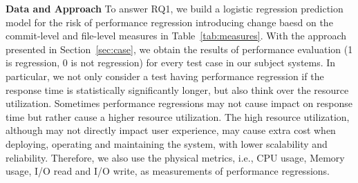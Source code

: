 

 \textbf{Data and Approach}
To answer RQ1, we build a logistic regression prediction model for the risk of performance regression introducing change baesd on the commit-level and file-level measures in Table~\ref{tab:measures}. With the approach presented in Section~\ref{sec:case}, we obtain the results of performance evaluation (1 is regression, 0 is not regression) for every test case in our subject systems. In particular, we not only consider a test having performance regression if the response time is statistically significantly longer, but also think over the resource utilization. Sometimes performance regressions may not cause impact on response time but rather cause a higher resource utilization. The high resource utilization, although may not directly impact user experience, may cause extra cost when deploying, operating and maintaining the system, with lower scalability and reliability. 
Therefore, we also use the physical metrics, i.e., CPU usage, Memory usage, I/O read and I/O write, as measurements of performance regressions. 

